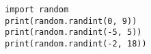 %
%
\begin {lstlisting}
import random
print(random.randint(0, 9))
print(random.randint(-5, 5))
print(random.randint(-2, 18))
\end{lstlisting}
